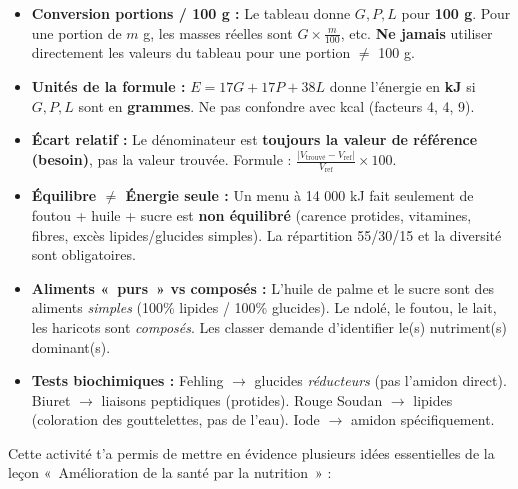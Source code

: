\documentclass[11pt]{article}
\newcounter{popsec}
\newcounter{popsub}
\newcommand{\courssub}[1]{%
  \stepcounter{popsub}%
  \par\vspace{9pt}\noindent{\popxbold\fontsize{11.5}{13}\selectfont\color{popink}{\color{poporange}\thepopsec.\thepopsub}\hspace{6pt}#1}\par\nopagebreak\vspace{4pt}
}
\begin{document}
\begin{attention}
\begin{itemize}
\item \textbf{Conversion portions / 100 g :} Le tableau donne $G, P, L$ pour \textbf{100 g}. Pour une portion de $m$ g, les masses réelles sont $G \times \frac{m}{100}$, etc. \textbf{Ne jamais} utiliser directement les valeurs du tableau pour une portion $\neq$ 100 g.
\item \textbf{Unités de la formule :} $E = 17G + 17P + 38L$ donne l'énergie en \textbf{kJ} si $G, P, L$ sont en \textbf{grammes}. Ne pas confondre avec kcal (facteurs 4, 4, 9).
\item \textbf{Écart relatif :} Le dénominateur est \textbf{toujours la valeur de référence (besoin)}, pas la valeur trouvée. Formule : $\frac{|V_{\text{trouvé}} - V_{\text{ref}}|}{V_{\text{ref}}} \times 100$.
\item \textbf{Équilibre $\neq$ Énergie seule :} Un menu à 14 000 kJ fait seulement de foutou + huile + sucre est \textbf{non équilibré} (carence protides, vitamines, fibres, excès lipides/glucides simples). La répartition 55/30/15 et la diversité sont obligatoires.
\item \textbf{Aliments «~purs~» vs composés :} L'huile de palme et le sucre sont des aliments \emph{simples} (100\% lipides / 100\% glucides). Le ndolé, le foutou, le lait, les haricots sont \emph{composés}. Les classer demande d'identifier le(s) nutriment(s) dominant(s).
\item \textbf{Tests biochimiques :} Fehling $\rightarrow$ glucides \emph{réducteurs} (pas l'amidon direct). Biuret $\rightarrow$ liaisons peptidiques (protides). Rouge Soudan $\rightarrow$ lipides (coloration des gouttelettes, pas de l'eau). Iode $\rightarrow$ amidon spécifiquement.
\end{itemize}
\end{attention}

\courssub{Bilan de l'activité}

Cette activité t'a permis de mettre en évidence plusieurs idées essentielles de la leçon «~Amélioration de la santé par la nutrition~» :
\end{document}
